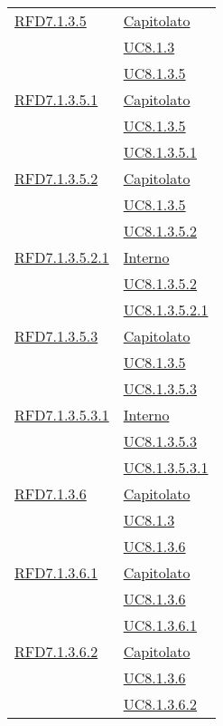 \begin{longtable}{|>{\centering}m{5cm}|m{5cm}<{\centering}|}
\hyperlink{RFD7.1.3.5}{RFD7.1.3.5} & \hyperlink{Capitolato}{Capitolato}\\
& \hyperref[UC8.1.3]{UC8.1.3}\\
& \hyperref[UC8.1.3.5]{UC8.1.3.5}\\ \hline

\hyperlink{RFD7.1.3.5.1}{RFD7.1.3.5.1} & \hyperlink{Capitolato}{Capitolato}\\
& \hyperref[UC8.1.3.5]{UC8.1.3.5}\\
& \hyperref[UC8.1.3.5.1]{UC8.1.3.5.1}\\ \hline

\hyperlink{RFD7.1.3.5.2}{RFD7.1.3.5.2} & \hyperlink{Capitolato}{Capitolato}\\
& \hyperref[UC8.1.3.5]{UC8.1.3.5}\\
& \hyperref[UC8.1.3.5.2]{UC8.1.3.5.2}\\ \hline

\hyperlink{RFD7.1.3.5.2.1}{RFD7.1.3.5.2.1} & \hyperlink{Interno}{Interno}\\
& \hyperref[UC8.1.3.5.2]{UC8.1.3.5.2}\\
& \hyperref[UC8.1.3.5.2.1]{UC8.1.3.5.2.1}\\ \hline

\hyperlink{RFD7.1.3.5.3}{RFD7.1.3.5.3} & \hyperlink{Capitolato}{Capitolato}\\
& \hyperref[UC8.1.3.5]{UC8.1.3.5}\\
& \hyperref[UC8.1.3.5.3]{UC8.1.3.5.3}\\ \hline

\hyperlink{RFD7.1.3.5.3.1}{RFD7.1.3.5.3.1} & \hyperlink{Interno}{Interno}\\
& \hyperref[UC8.1.3.5.3]{UC8.1.3.5.3}\\
& \hyperref[UC8.1.3.5.3.1]{UC8.1.3.5.3.1}\\ \hline

\hyperlink{RFD7.1.3.6}{RFD7.1.3.6} & \hyperlink{Capitolato}{Capitolato}\\
& \hyperref[UC8.1.3]{UC8.1.3}\\
& \hyperref[UC8.1.3.6]{UC8.1.3.6}\\ \hline

\hyperlink{RFD7.1.3.6.1}{RFD7.1.3.6.1} & \hyperlink{Capitolato}{Capitolato}\\
& \hyperref[UC8.1.3.6]{UC8.1.3.6}\\
& \hyperref[UC8.1.3.6.1]{UC8.1.3.6.1}\\ \hline

\hyperlink{RFD7.1.3.6.2}{RFD7.1.3.6.2} & \hyperlink{Capitolato}{Capitolato}\\
& \hyperref[UC8.1.3.6]{UC8.1.3.6}\\
& \hyperref[UC8.1.3.6.2]{UC8.1.3.6.2}\\ \hline


\end{longtable}
